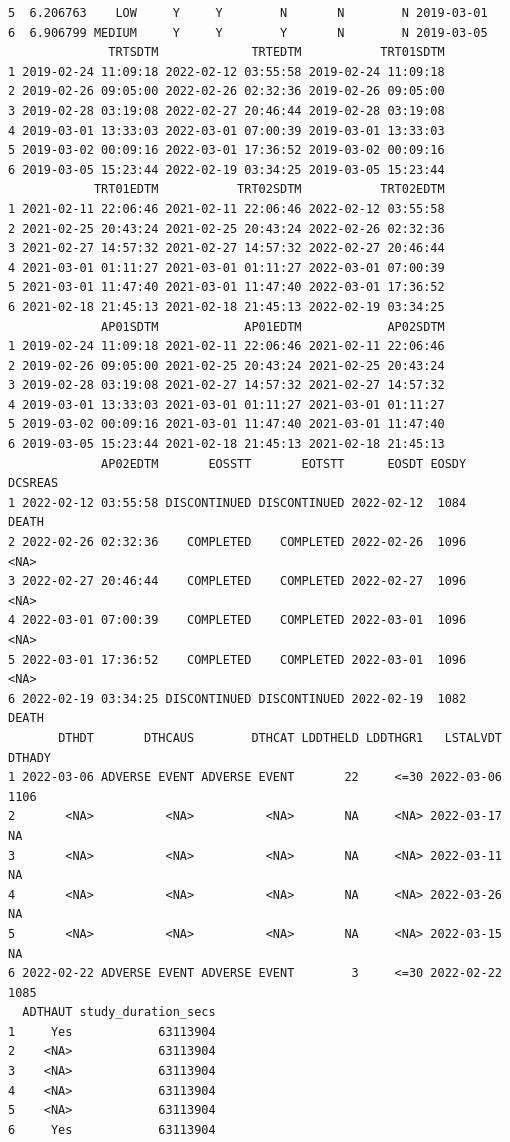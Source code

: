 \documentclass[
  letterpaper,
  DIV=11,
  numbers=noendperiod]{scrreprt}
\begin{document}
\begin{verbatim}
5  6.206763    LOW     Y     Y        N       N        N 2019-03-01
6  6.906799 MEDIUM     Y     Y        Y       N        N 2019-03-05
              TRTSDTM             TRTEDTM           TRT01SDTM
1 2019-02-24 11:09:18 2022-02-12 03:55:58 2019-02-24 11:09:18
2 2019-02-26 09:05:00 2022-02-26 02:32:36 2019-02-26 09:05:00
3 2019-02-28 03:19:08 2022-02-27 20:46:44 2019-02-28 03:19:08
4 2019-03-01 13:33:03 2022-03-01 07:00:39 2019-03-01 13:33:03
5 2019-03-02 00:09:16 2022-03-01 17:36:52 2019-03-02 00:09:16
6 2019-03-05 15:23:44 2022-02-19 03:34:25 2019-03-05 15:23:44
            TRT01EDTM           TRT02SDTM           TRT02EDTM
1 2021-02-11 22:06:46 2021-02-11 22:06:46 2022-02-12 03:55:58
2 2021-02-25 20:43:24 2021-02-25 20:43:24 2022-02-26 02:32:36
3 2021-02-27 14:57:32 2021-02-27 14:57:32 2022-02-27 20:46:44
4 2021-03-01 01:11:27 2021-03-01 01:11:27 2022-03-01 07:00:39
5 2021-03-01 11:47:40 2021-03-01 11:47:40 2022-03-01 17:36:52
6 2021-02-18 21:45:13 2021-02-18 21:45:13 2022-02-19 03:34:25
             AP01SDTM            AP01EDTM            AP02SDTM
1 2019-02-24 11:09:18 2021-02-11 22:06:46 2021-02-11 22:06:46
2 2019-02-26 09:05:00 2021-02-25 20:43:24 2021-02-25 20:43:24
3 2019-02-28 03:19:08 2021-02-27 14:57:32 2021-02-27 14:57:32
4 2019-03-01 13:33:03 2021-03-01 01:11:27 2021-03-01 01:11:27
5 2019-03-02 00:09:16 2021-03-01 11:47:40 2021-03-01 11:47:40
6 2019-03-05 15:23:44 2021-02-18 21:45:13 2021-02-18 21:45:13
             AP02EDTM       EOSSTT       EOTSTT      EOSDT EOSDY DCSREAS
1 2022-02-12 03:55:58 DISCONTINUED DISCONTINUED 2022-02-12  1084   DEATH
2 2022-02-26 02:32:36    COMPLETED    COMPLETED 2022-02-26  1096    <NA>
3 2022-02-27 20:46:44    COMPLETED    COMPLETED 2022-02-27  1096    <NA>
4 2022-03-01 07:00:39    COMPLETED    COMPLETED 2022-03-01  1096    <NA>
5 2022-03-01 17:36:52    COMPLETED    COMPLETED 2022-03-01  1096    <NA>
6 2022-02-19 03:34:25 DISCONTINUED DISCONTINUED 2022-02-19  1082   DEATH
       DTHDT       DTHCAUS        DTHCAT LDDTHELD LDDTHGR1   LSTALVDT DTHADY
1 2022-03-06 ADVERSE EVENT ADVERSE EVENT       22     <=30 2022-03-06   1106
2       <NA>          <NA>          <NA>       NA     <NA> 2022-03-17     NA
3       <NA>          <NA>          <NA>       NA     <NA> 2022-03-11     NA
4       <NA>          <NA>          <NA>       NA     <NA> 2022-03-26     NA
5       <NA>          <NA>          <NA>       NA     <NA> 2022-03-15     NA
6 2022-02-22 ADVERSE EVENT ADVERSE EVENT        3     <=30 2022-02-22   1085
  ADTHAUT study_duration_secs
1     Yes            63113904
2    <NA>            63113904
3    <NA>            63113904
4    <NA>            63113904
5    <NA>            63113904
6     Yes            63113904


\end{verbatim}
\end{document}
